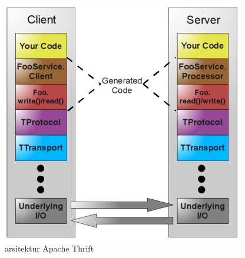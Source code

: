 \begin{figure}
    \begin{center}
        \includegraphics[width=0.25\textheight]{resources/chapter-2/thrift-arch.png}
        \caption{arsitektur Apache Thrift \parencite{prunicki_thrift}}
    \end{center}
\end{figure}

